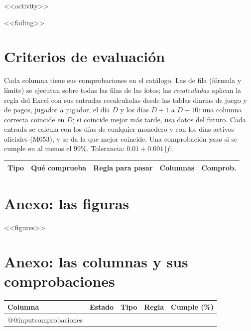 <<activity>>

<<failing>>

\section{Criterios de evaluación}
Cada columna tiene sus comprobaciones en el catálogo. Las de fila (fórmula y límite) se ejecutan sobre todas las filas de las fotos; las \emph{recalculadas} aplican la regla del Excel con sus entradas recalculadas desde las tablas diarias de juego y de pagos, jugador a jugador, el día $D$ y los días $D+1$ a $D+10$: una columna correcta coincide en $D$; si coincide mejor más tarde, usa datos del futuro. Cada entrada se calcula con los días de cualquier monedero y con los días activos oficiales (M053), y se da la que mejor coincide. Una comprobación \emph{pasa} si se cumple en al menos el 99\%. Tolerancia: $0.01 + 0.001\,|f|$.

\begin{center}\small
\begin{tabular}{@{}>{\raggedright\arraybackslash}p{2.1cm}>{\raggedright\arraybackslash}p{5.6cm}>{\raggedright\arraybackslash}p{4.3cm}rr@{}}
\toprule
Tipo & Qué comprueba & Regla para pasar & Columnas & Comprob.\\
\midrule

\end{tabular}
\end{center}

\clearpage
\appendix
\section{Anexo: las figuras}\label{sec:figures}
<<figures>>

\clearpage
\section{Anexo: las columnas y sus comprobaciones}\label{sec:columns}\label{sec:checks}
\begin{small}
\setlength{\tabcolsep}{4pt}
\begin{longtable}{@{}>{\raggedright\arraybackslash}p{3.7cm}>{\raggedright\arraybackslash}p{2.4cm}>{\raggedright\arraybackslash}p{2.1cm}>{\raggedright\arraybackslash}p{4.8cm}r@{}}
\toprule
Columna & Estado & Tipo & Regla & Cumple (\%)\\
\midrule
\endhead
\bottomrule
\endfoot
\csname @@input\endcsname comprobaciones   %
\end{longtable}
\end{small}


